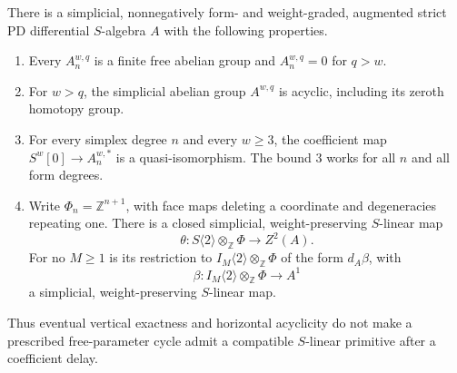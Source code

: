 \begin{theorem}
\label{AL02}
There is a simplicial, nonnegatively form- and weight-graded,
augmented strict PD differential $S$-algebra $A$ with the following
properties.
\begin{enumerate}
\item Every $A_n^{w,q}$ is a finite free abelian group and
      $A_n^{w,q}=0$ for $q>w$.
\item For $w>q$, the simplicial abelian group $A^{w,q}$ is acyclic,
      including its zeroth homotopy group.
\item For every simplex degree $n$ and every $w\geq3$,
      the coefficient map
      $S^w[0]\to A_n^{w,*}$ is a quasi-isomorphism.
      The bound $3$ works for all $n$ and all form degrees.
\item Write $\Phi_n=\mathbb Z^{n+1}$, with face maps deleting a
      coordinate and degeneracies repeating one.  There is a closed
      simplicial, weight-preserving $S$-linear map
      \[
       \theta:S\langle2\rangle\otimes_{\mathbb Z}\Phi
           \longrightarrow Z^2(A).
       \tag{AL.2}
      \]
      For no $M\geq1$ is its restriction to
      $I_M\langle2\rangle\otimes_{\mathbb Z}\Phi$
      of the form $d_A\beta$, with
      \[
       \beta:I_M\langle2\rangle\otimes_{\mathbb Z}\Phi
                    \longrightarrow A^1
      \]
      a simplicial, weight-preserving $S$-linear map.
\end{enumerate}
Thus eventual vertical exactness and horizontal acyclicity do not
make a prescribed free-parameter cycle admit a compatible
$S$-linear primitive after a coefficient delay.
\end{theorem}

